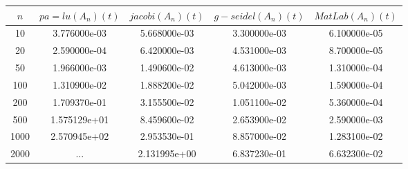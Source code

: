 \documentclass{article}
\begin{document}
\begin{tabularx}{400pt}{c|c|c|c|c}
 $n$ & $pa=lu(A_n)(t)$ & $jacobi(A_n)(t)$ & $g-seidel(A_n)(t)$ & $MatLab(A_n)(t)$ \\
\hline
10 & 3.776000e-03 & 5.668000e-03 & 3.300000e-03 & 6.100000e-05 \\
 \hline 
20 & 2.590000e-04 & 6.420000e-03 & 4.531000e-03 & 8.700000e-05 \\
 \hline 
50 & 1.966000e-03 & 1.490600e-02 & 4.613000e-03 & 1.310000e-04 \\
 \hline 
100 & 1.310900e-02 & 1.888200e-02 & 5.042000e-03 & 1.590000e-04 \\
 \hline 
200 & 1.709370e-01 & 3.155500e-02 & 1.051100e-02 & 5.360000e-04 \\
 \hline 
500 & 1.575129e+01 & 8.459600e-02 & 2.653900e-02 & 2.590000e-03 \\
 \hline 
1000 & 2.570945e+02 & 2.953530e-01 & 8.857000e-02 & 1.283100e-02 \\
 \hline 
2000 & ... & 2.131995e+00 & 6.837230e-01 & 6.632300e-02 \\
\hline 
\end{tabularx}
\end{document}
